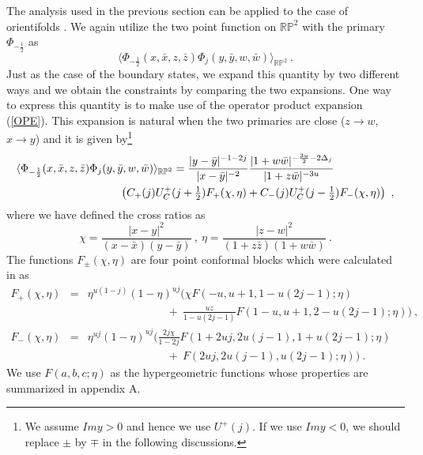 \documentclass[a4paper,12pt]{article}
\newcommand{\brp}{{\mathbb R \mathbb P}^2}
\newcommand{\nn}{\nonumber\\}
\begin{document}
The analysis used in the previous section can be applied to the
case of orientifolds \cite{sewingcs}.
We again utilize the two point function on $\brp$ with
the primary $\Phi_{-\frac{1}{2}}$ as
\begin{equation}
 \langle \Phi_{-\frac{1}{2}} 
 (x,\bar{x},z,\bar{z}) \Phi_{j} (y,\bar{y},w,\bar{w}) 
 \rangle_{\brp} ~.
\label{tpf}
\end{equation}
Just as the case of the boundary states, we expand this quantity by two
different ways and we obtain the constraints by comparing the two
expansions. One way to express this quantity is to make use of the
operator product expansion (\ref{OPE}). 
This expansion is natural when the two primaries are close ($z
\to w$, $x \to y$) and it is given by\footnote{
We assume $Im y > 0$ and hence we use $U^+ (j)$. If we use $Im y < 0$,
we should replace $\pm$ by $\mp$ in the following discussions.
}
\begin{eqnarray}
 \lefteqn{ \langle \Phi_{-\frac{1}{2}} (x,\bar{x},z,\bar{z}) 
    \Phi_{j} (y,\bar{y},w,\bar{w}) \rangle_{\brp} = 
  \frac{|y - \bar{y} |^{-1-2j}}{|x - \bar{y}|^{-2}} 
  \frac{|1 + w \bar{w} |^{-\frac{3u}{2}-2\Delta_j}}{|1 + z \bar{w} |^{-3u}}}
  \nn && \hspace{3cm}
   \left(
    C_+ (j) U^+_C (j+ \textstyle \frac{1}{2}) F_+(\chi, \eta) +  
    C_- (j) U^+_C (j- \textstyle \frac{1}{2}) F_-(\chi, \eta)
   \right) ~,
\label{e1}
\end{eqnarray} 
where we have defined the cross ratios as
\begin{equation}
 \chi = \frac{|x - y |^2}{(x - \bar{x})(y - \bar{y})} ~,~
 \eta = \frac{|z-w|^2}{(1+z\bar{z})(1+w\bar{w})} ~.
\end{equation}
The functions
$F_{\pm} (\chi,\eta)$ 
are four point conformal blocks which were calculated in
\cite{Teschner} as
\begin{eqnarray}
F_+ (\chi,\eta) &=& \eta^{u(1-j)} (1-\eta)^{uj} \biggl(
 \chi F(-u,u+1,1-u(2j-1);\eta) \nn &&\hspace{3cm} +~ 
  \frac{uz}{1-u(2j-1)} F (1-u,u+1,2-u(2j-1);\eta)\biggr) ~,\nn
F_- (\chi,\eta) &=& \eta^{uj} (1-\eta)^{uj} \biggl(
 \frac{2j \chi}{1-2j} F(1+2uj,2u(j-1),1+u(2j-1);\eta) \nn &&\hspace{3cm} +~ 
  F (2uj,2u(j-1),u(2j-1);\eta) \biggr) ~.
\end{eqnarray} 
We use $F(a,b,c;\eta)$ as the hypergeometric functions whose
properties are summarized in appendix A.
\end{document}
